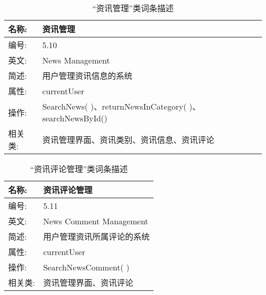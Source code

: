 \begin{table}[H]  
\caption{“资讯管理”类词条描述}  
\begin{center}  
    \begin{tabular}{l p{11cm}} 
        \hline
        \quad 名称:  & 资讯管理 \\
        \hline
        \quad 编号:  & 5.10 \\
        \hline
        \quad 英文:  &  News Management\\
        \hline
        \quad 简述:  & 用户管理资讯信息的系统 \\
        \hline
        \quad 属性:  & currentUser \\
        \hline
        \quad 操作:  & SearchNews( )、returnNewsInCategory( )、searchNewsById()\\
        \hline
        \quad 相关类: & 资讯管理界面、资讯类别、资讯信息、资讯评论\\
        \hline
    \end{tabular}
\end{center}
\end{table}

\begin{table}[H]  
\caption{“资讯评论管理”类词条描述}  
\begin{center}  
    \begin{tabular}{l p{11cm}} 
        \hline
        \quad 名称:  & 资讯评论管理 \\
        \hline
        \quad 编号:  & 5.11 \\
        \hline
        \quad 英文:  &  News Comment Management\\
        \hline
        \quad 简述:  & 用户管理资讯所属评论的系统 \\
        \hline
        \quad 属性:  & currentUser \\
        \hline
        \quad 操作:  & SearchNewsComment( ) \\
        \hline
        \quad 相关类: & 资讯管理界面、资讯评论\\
        \hline
    \end{tabular}
\end{center}
\end{table}


